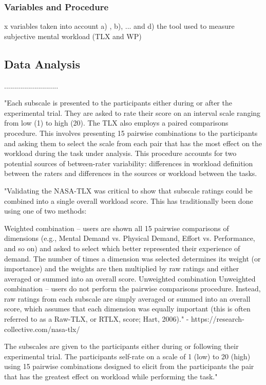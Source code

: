 \documentclass[man]{apa7}
\begin{document}
\subsubsection{Variables and Procedure}

x variables taken into account a) , b), ... and d) the tool used to measure subjective mental workload (TLX and WP)

\subsection{Data Analysis}
...........................

"Each subscale is presented to the participants either during or after the experimental trial. They are asked to rate their score on an interval scale ranging from low (1) to high (20). The TLX also employs a paired comparisons procedure. This involves presenting 15 pairwise combinations to the participants and asking them to select the scale from each pair that has the most effect on the workload during the task under analysis. This procedure accounts for two potential sources of between-rater variability: differences in workload definition between the raters and differences in the sources or workload between the tasks.


"Validating the NASA-TLX was critical to show that subscale ratings could be combined into a single overall workload score. This has traditionally been done using one of two methods:

Weighted combination – users are shown all 15 pairwise comparisons of dimensions (e.g., Mental Demand vs. Physical Demand, Effort vs. Performance, and so on) and asked to select which better represented their experience of demand. The number of times a dimension was selected determines its weight (or importance) and the weights are then multiplied by raw ratings and either averaged or summed into an overall score.
Unweighted combination
Unweighted combination – users do not perform the pairwise comparisons procedure. Instead, raw ratings from each subscale are simply averaged or summed into an overall score, which assumes that each dimension was equally important (this is often referred to as a Raw-TLX, or RTLX, score; Hart, 2006)." - https://research-collective.com/nasa-tlx/

The subscales are given to the participants either during or following their experimental trial. The participants self-rate on a scale of 1 (low) to 20 (high) using 15 pairwise combinations designed to elicit from the participants the pair that has the greatest effect on workload while performing the task."
\end{document}
